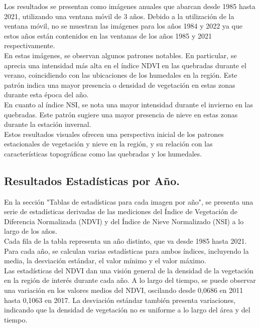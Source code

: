 Los resultados se presentan como imágenes anuales que abarcan desde 1985 hasta 2021, utilizando una ventana móvil de 3 años. Debido a la utilización de la ventana móvil, no se muestran las imágenes para los años 1984 y 2022 ya que estos años están contenidos en las ventanas de los años 1985 y 2021 respectivamente.\\

En estas imágenes, se observan algunos patrones notables. En particular, se aprecia una intensidad más alta en el índice NDVI en las quebradas durante el verano, coincidiendo con las ubicaciones de los humedales en la región. Este patrón indica una mayor presencia o densidad de vegetación en estas zonas durante esta época del año.\\

En cuanto al índice NSI, se nota una mayor intensidad durante el invierno en las quebradas. Este patrón sugiere una mayor presencia de nieve en estas zonas durante la estación invernal.\\

Estos resultados visuales ofrecen una perspectiva inicial de los patrones estacionales de vegetación y nieve en la región, y su relación con las características topográficas como las quebradas y los humedales.\\



\newpage





\subsection{\textbf{Resultados Estadísticas por Año.}}
En la sección "Tablas de estadísticas para cada imagen por año", se presenta una serie de estadísticas derivadas de las mediciones del Índice de Vegetación de Diferencia Normalizada (NDVI) y del Índice de Nieve Normalizado (NSI) a lo largo de los años.\\

Cada fila de la tabla representa un año distinto, que va desde 1985 hasta 2021. Para cada año, se calculan varias estadísticas para ambos índices, incluyendo la media, la desviación estándar, el valor mínimo y el valor máximo.\\

Las estadísticas del NDVI dan una visión general de la densidad de la vegetación en la región de interés durante cada año. A lo largo del tiempo, se puede observar una variación en los valores medios del NDVI, oscilando desde 0,0686 en 2011 hasta 0,1063 en 2017. La desviación estándar también presenta variaciones, indicando que la densidad de vegetación no es uniforme a lo largo del área y del tiempo.\\ 

